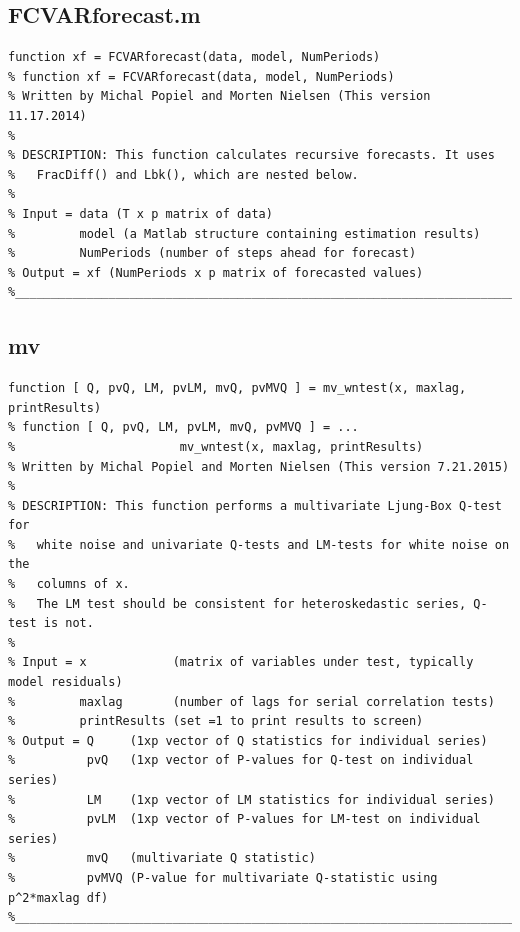 \documentclass[10pt]{article}
\begin{document}
\subsection{FCVARforecast.m}
\begin{lstlisting}[frame=single,caption={FCVARforecast.m}]
function xf = FCVARforecast(data, model, NumPeriods)
% function xf = FCVARforecast(data, model, NumPeriods)
% Written by Michal Popiel and Morten Nielsen (This version 11.17.2014)
% 
% DESCRIPTION: This function calculates recursive forecasts. It uses
%   FracDiff() and Lbk(), which are nested below.
%
% Input = data (T x p matrix of data)
%         model (a Matlab structure containing estimation results)
%         NumPeriods (number of steps ahead for forecast)
% Output = xf (NumPeriods x p matrix of forecasted values)
%_________________________________________________________________________
\end{lstlisting}


\subsection{mv}

\begin{lstlisting}[frame=single,caption={mv\textunderscore{wntest.m}}]
function [ Q, pvQ, LM, pvLM, mvQ, pvMVQ ] = mv_wntest(x, maxlag, printResults)
% function [ Q, pvQ, LM, pvLM, mvQ, pvMVQ ] = ...
%                       mv_wntest(x, maxlag, printResults)
% Written by Michal Popiel and Morten Nielsen (This version 7.21.2015)
% 
% DESCRIPTION: This function performs a multivariate Ljung-Box Q-test for  
% 	white noise and univariate Q-tests and LM-tests for white noise on the 
% 	columns of x.
% 	The LM test should be consistent for heteroskedastic series, Q-test is not. 
%
% Input = x            (matrix of variables under test, typically model residuals)
%         maxlag       (number of lags for serial correlation tests)
%         printResults (set =1 to print results to screen)
% Output = Q     (1xp vector of Q statistics for individual series)
%		   pvQ 	 (1xp vector of P-values for Q-test on individual series)
%          LM    (1xp vector of LM statistics for individual series)
%		   pvLM	 (1xp vector of P-values for LM-test on individual series)
%          mvQ   (multivariate Q statistic)
%          pvMVQ (P-value for multivariate Q-statistic using p^2*maxlag df)
%_________________________________________________________________________
\end{lstlisting}
\end{document}
